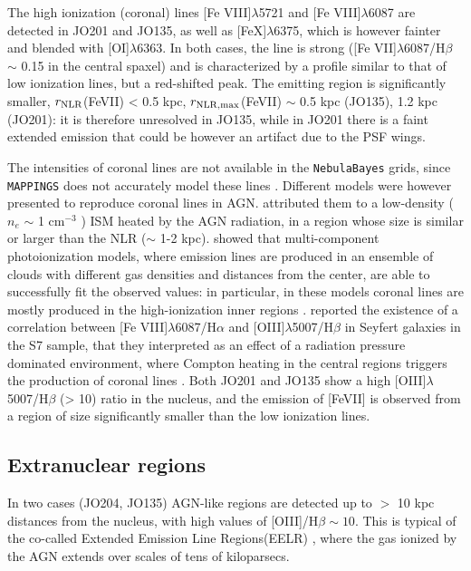 \documentclass[fleqn,usenatbib]{mnras}
\begin{document}
The high ionization (coronal) lines [Fe VIII]$\lambda$5721  and [Fe VIII]$\lambda$6087 are detected in JO201 and JO135, as well as [FeX]$\lambda$6375, which is however fainter and blended with [OI]$\lambda$6363. In both cases, the line is strong ([Fe VII]$\lambda$6087/H$\beta$ $\sim$ 0.15 in the central spaxel) and is characterized by a profile similar to that of low ionization lines, but a red-shifted peak. The emitting region is significantly smaller, $r_{\rm NLR}$(FeVII) < 0.5 kpc, $r_{\rm NLR, max}$(FeVII) $\sim$ 0.5 kpc (JO135), 1.2 kpc (JO201): it is therefore unresolved in JO135, while in JO201 there is a faint extended emission that could be however an artifact due to the PSF wings. 

The intensities of coronal lines are not available in the \texttt{NebulaBayes} grids, since \texttt{MAPPINGS} does not accurately model these lines \citep{2016ApJ...824...50D}. Different models were however presented to reproduce coronal lines in AGN. \cite{1989ApJ...343..678K} attributed them to a low-density ($n_e$ $\sim$ 1 cm$^{-3}$ ) ISM heated by the AGN radiation, in a region whose size is similar or larger than the NLR ($\sim$ 1-2 kpc).
\cite{1997ApJ...487..122F,1997A&A...323...31K} showed that multi-component photoionization models, where emission lines are produced in an ensemble of clouds with different gas densities and distances from the center, are able to successfully fit the observed values: in particular, in these models  coronal lines are mostly produced in the high-ionization inner regions \citep[see also][]{2010MNRAS.405.1315M}.  \cite{2017ApJS..232...11T} reported the existence of a correlation between [Fe VIII]$\lambda$6087/H$\alpha$ and [OIII]$\lambda$5007/H$\beta$ in Seyfert galaxies in the S7 sample, that they interpreted as an effect of a radiation pressure dominated environment, where Compton heating in the central regions triggers the production of coronal lines  \citep{2016ApJ...824...50D}. 
Both JO201 and JO135 show a high [OIII]$\lambda$5007/H$\beta$ (> 10) ratio in the nucleus, and the emission of [FeVII] is observed from a region  of size significantly smaller than the low ionization lines.


\subsection{Extranuclear regions}
\label{sect:ExtNucleus}


In two cases (JO204, JO135)  AGN-like regions are detected up to $>$ 10 kpc distances from the nucleus,  with high values of [OIII]/H$\beta \sim 10$. This is typical of the co-called Extended Emission Line Regions(EELR)  \citep[see e.g.][]{2004AJ....127...90Y,2018MNRAS.480.5203M}, where the  gas  ionized by the AGN extends over scales of tens of kiloparsecs.  
\end{document}

